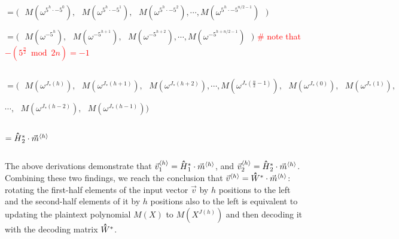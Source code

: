 $= \bm{(} \text{ } M(\omega^{5^h\cdot -5^0}), \text{ } M(\omega^{5^h\cdot -5^1}), \text{ } M(\omega^{5^h\cdot -5^2}), \cdots, M(\omega^{5^h\cdot -5^{n/2-1}}) \text{ } \bm{)}$

$= \bm{(} \text{ } M(\omega^{-5^{h}}), \text{ } M(\omega^{-5^{h+1}}), \text{ } M(\omega^{-5^{h+2}}), \cdots, M(\omega^{-5^{h+n/2-1}}) \text{ } \bm{)}$ \textcolor{red}{ \# note that $-(5^{\frac{n}{2}} \bmod 2n) = -1$}

$ $

$= \bm{(} \text{ } M(\omega^{J_*(h)}), \text{ } M(\omega^{J_*(h+1)}), \text{ } M(\omega^{J_*(h+2)}), \cdots, M(\omega^{J_*(\frac{n}{2}-1)}), \text{ } M(\omega^{J_*(0)}), \text{ }M(\omega^{J_*(1)}),$ 
                                    
$\cdots, \text{ } M(\omega^{J_*(h-2)}), \text{ } M(\omega^{J_*(h-1)})  \bm{)}$ 

$ $

$= \hathat H_2^{*}\cdot \vec{m}^{\langle h \rangle}$


$ $

The above derivations demonstrate that $\vec{v}_1^{\langle h \rangle} = \hathat H_1^{*}\cdot \vec{m}^{\langle h \rangle}$, and $\vec{v}_2^{\langle h \rangle} = \hathat H_2^{*}\cdot \vec{m}^{\langle h \rangle}$. Combining these two findings, we reach the conclusion that $\vec{v}^{\langle h \rangle} = \hathat{W}^* \cdot \vec{m}^{\langle h \rangle}$: rotating the first-half elements of the input vector $\vec{v}$ by $h$ positions to the left and the second-half elements of it by $h$ positions also to the left is equivalent to updating the plaintext polynomial $M(X)$ to $M(X^{J(h)})$ and then decoding it with the decoding matrix $\hathat W^*$. 

